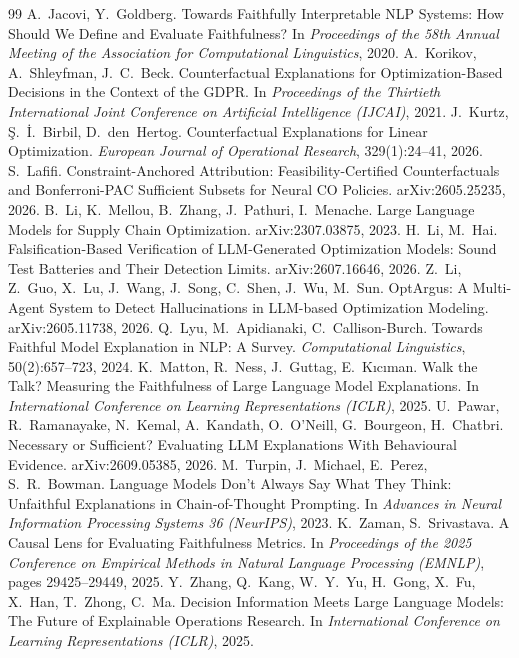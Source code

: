 \begin{thebibliography}{99}
 A.~Jacovi, Y.~Goldberg. Towards Faithfully Interpretable NLP Systems: How Should
We Define and Evaluate Faithfulness? In \emph{Proceedings of the 58th Annual Meeting of the Association for
Computational Linguistics}, 2020.
 A.~Korikov, A.~Shleyfman, J.~C.~Beck. Counterfactual Explanations for
Optimization-Based Decisions in the Context of the GDPR. In \emph{Proceedings of the Thirtieth International
Joint Conference on Artificial Intelligence (IJCAI)}, 2021.
 J.~Kurtz, {\c S}.~{\.I}.~Birbil, D.~den~Hertog. Counterfactual Explanations for Linear
Optimization. \emph{European Journal of Operational Research}, 329(1):24--41, 2026.
 S.~Lafifi. Constraint-Anchored Attribution: Feasibility-Certified Counterfactuals and
Bonferroni-PAC Sufficient Subsets for Neural CO Policies. arXiv:2605.25235, 2026.
 B.~Li, K.~Mellou, B.~Zhang, J.~Pathuri, I.~Menache. Large Language Models for Supply
Chain Optimization. arXiv:2307.03875, 2023.
 H.~Li, M.~Hai. Falsification-Based Verification of LLM-Generated Optimization Models:
Sound Test Batteries and Their Detection Limits. arXiv:2607.16646, 2026.
 Z.~Li, Z.~Guo, X.~Lu, J.~Wang, J.~Song, C.~Shen, J.~Wu, M.~Sun. OptArgus: A Multi-Agent
System to Detect Hallucinations in LLM-based Optimization Modeling. arXiv:2605.11738, 2026.
 Q.~Lyu, M.~Apidianaki, C.~Callison-Burch. Towards Faithful Model Explanation in NLP:
A Survey. \emph{Computational Linguistics}, 50(2):657--723, 2024.
 K.~Matton, R.~Ness, J.~Guttag, E.~K{\i}c{\i}man. Walk the Talk? Measuring the
Faithfulness of Large Language Model Explanations. In \emph{International Conference on Learning
Representations (ICLR)}, 2025.
 U.~Pawar, R.~Ramanayake, N.~Kemal, A.~Kandath, O.~O'Neill, G.~Bourgeon, H.~Chatbri.
Necessary or Sufficient? Evaluating LLM Explanations With Behavioural Evidence. arXiv:2609.05385, 2026.
 M.~Turpin, J.~Michael, E.~Perez, S.~R.~Bowman. Language Models Don't Always Say
What They Think: Unfaithful Explanations in Chain-of-Thought Prompting. In \emph{Advances in Neural
Information Processing Systems 36 (NeurIPS)}, 2023.
 K.~Zaman, S.~Srivastava. A Causal Lens for Evaluating Faithfulness Metrics. In
\emph{Proceedings of the 2025 Conference on Empirical Methods in Natural Language Processing (EMNLP)},
pages 29425--29449, 2025.
 Y.~Zhang, Q.~Kang, W.~Y.~Yu, H.~Gong, X.~Fu, X.~Han, T.~Zhong, C.~Ma. Decision Information
Meets Large Language Models: The Future of Explainable Operations Research. In \emph{International
Conference on Learning Representations (ICLR)}, 2025.
\end{thebibliography}
